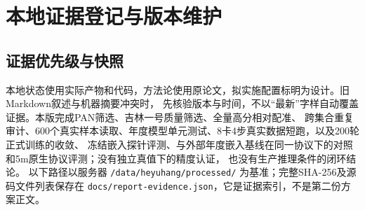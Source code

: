 \documentclass[UTF8,fontset=fandol,zihao=5,a4paper]{ctexart}
\newcommand{\reportpage}{\clearpage}
\begin{document}
\reportpage
\appendix
\section{本地证据登记与版本维护}
\subsection{证据优先级与快照}
本地状态使用实际产物和代码，方法论使用原论文，拟实施配置标明为设计。旧Markdown叙述与机器摘要冲突时，
先核验版本与时间，不以“最新”字样自动覆盖证据。本版完成PAN筛选、吉林一号质量筛选、全量高分相对配准、
跨集合重复审计、600个真实样本读取、年度模型单元测试、8卡4步真实数据短跑，以及200轮正式训练的收敛、
冻结嵌入探针评测、与外部年度嵌入基线在同一协议下的对照和5m原生协议评测；没有独立真值下的精度认证，
也没有生产推理条件的闭环结论。
以下路径以服务器 \texttt{/data/heyuhang/processed/} 为基准；完整SHA-256及源码文件列表保存在
\texttt{docs/report-evidence.json}，它是证据索引，不是第二份方案正文。
\end{document}
